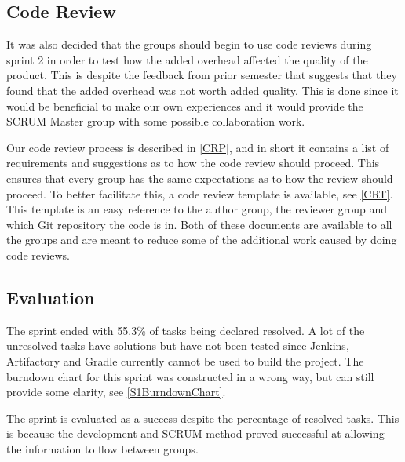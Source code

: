 \subsection{Code Review}
It was also decided that the groups should begin to use code reviews during
sprint 2 in order to test how the added overhead affected the quality of the
product. This is despite the feedback from prior semester that suggests that
they found that the added overhead was not worth added quality. This is done
since it would be beneficial to make our own experiences and it would provide
the SCRUM Master group with some possible collaboration work.\nl

Our code review process is described in \autoref{CRP}, and in short it contains
a list of requirements and suggestions as to how the code review should proceed.
This ensures that every group has the same expectations as to how the review
should proceed. To better facilitate this, a code review template is available,
see \autoref{CRT}. This template is an easy reference to the author group, the
reviewer group and which Git repository the code is in. Both of these documents
are available to all the groups and are meant to reduce some of the additional
work caused by doing code reviews.

\subsection{Evaluation}

The sprint ended with 55.3\% of tasks being declared resolved. A lot of the
unresolved tasks have solutions but have not been tested since Jenkins,
Artifactory and Gradle currently cannot be used to build the project. The
burndown chart for this sprint was constructed in a wrong way, but can still provide
some clarity, see \autoref{S1BurndownChart}.


The sprint is evaluated as a success despite the percentage of resolved
tasks. This is because the development and SCRUM method proved successful
at allowing the information to flow between groups.



